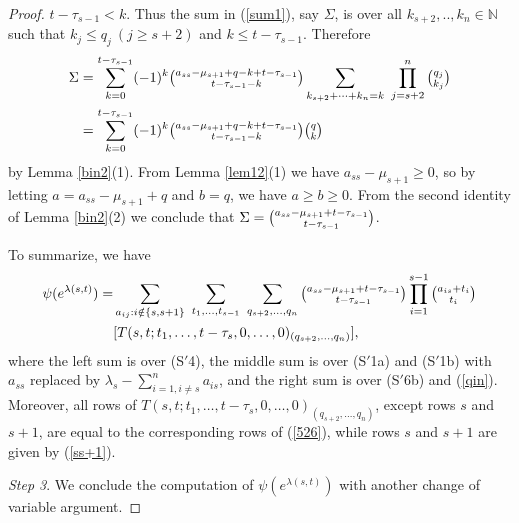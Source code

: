 \documentclass[ALCO,Unicode]{cedram}
\newcommand{\m}{\mu}
\numberwithin{equation}{section}
\begin{document}
\begin{proof}
$t-\tau_{s-1} <k$. Thus the sum in (\ref{sum1}), say $\Sigma$, is over all $k_{s+2},..,k_n \in \mathbb{N}$ such that $k_j \le q_j  \  (j \ge s+2)$ and $k \le t-\tau_{s-1}.$ Therefore \begin{align}
	\Sigma &= \sum_{k=0}^{t-\tau_{s-1}}(-1)^k\tbinom{a_{ss}-\mu_{s+1}+q-k+t-\tau_{s-1}}{t-\tau_{s-1}-k}\sum_{ k_{s+2}+\dots+k_n=k } \  \prod_{j=s+2}^{n}\tbinom{q_{j}}{k_{j}} \\\nonumber &=\sum_{k=0}^{t-\tau_{s-1}}(-1)^k\tbinom{a_{ss}-\mu_{s+1}+q-k+t-\tau_{s-1}}{t-\tau_{s-1}-k}\tbinom{q}{k}
\end{align}	
by Lemma \ref{bin2}(1). From Lemma \ref{lem12}(1) we have $a_{ss}-\mu_{s+1} \ge 0$, so by letting $a=a_{ss}-\mu_{s+1}+q$ and $b=q$, we have $a \ge b \ge 0$. From the second identity of Lemma \ref{bin2}(2) we conclude that $
\Sigma = \tbinom{a_{ss}-\m_{s+1}+t-\tau_{s-1}}{t-\tau_{s-1}}$. 

To summarize, we have
\begin{align}\label{620}
	\psi(e^{\lambda(s,t)})= 	&\sum_{a_{ij}: i \notin \{s, s+1\}} \  \sum_{t_1,\dots,t_{s-1}} \  \sum_{q_{s+2},\dots,q_{n}}     \tbinom{a_{ss}-\m_{s+1}+t-\tau_{s-1}}{t-\tau_{s-1}}\prod_{i=1}^{s-1}\tbinom{a_{is}+t_i}{t_i} \\\nonumber& [T(s,t;t_1,\dots,t-\tau_s,0,\dots,0)_{(q_{s+2},\dots,q_n)}], \end{align}	
where the left sum is over (S$'$4), the middle sum is over (S$'$1a) and (S$'$1b) with $a_{ss}$ replaced by $\lambda_{s}-\sum_{i=1, i\neq s}^{n}a_{is}$, and the right sum is over (S$'$6b) and (\ref{qin}). Moreover, all rows of $T(s,t;t_1,\dots,t-\tau_s,0,\dots,0)_{(q_{s+2},\dots,q_n)}$, except rows $s$ and $s+1$, are equal to the corresponding rows of (\ref{526}), while rows $s$ and $s+1$ are given by (\ref{ss+1}).
		
\textit{Step 3}. We conclude the computation of $\psi(e^{\lambda(s,t)})$ with another change of variable argument.


\end{proof}
\end{document}
